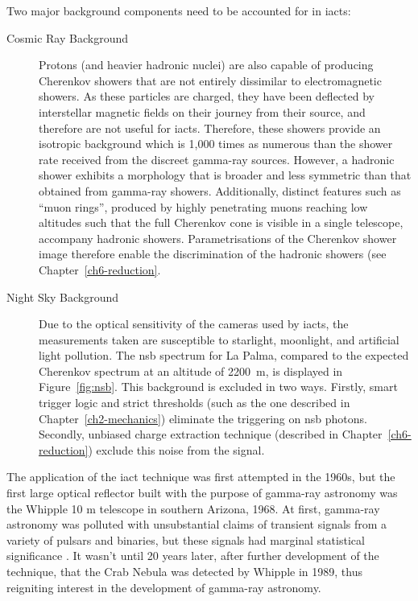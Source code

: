 Two major background components need to be accounted for in \glspl{iact}:
\begin{description}
\item [Cosmic Ray Background] Protons (and heavier hadronic nuclei) are also capable of producing Cherenkov showers that are not entirely dissimilar to electromagnetic showers. As these particles are charged, they have been deflected by interstellar magnetic fields on their journey from their source, and therefore are not useful for \glspl{iact}. Therefore, these showers provide an isotropic background which is 1,000 times as numerous than the shower rate received from the discreet gamma-ray sources. However, a hadronic shower exhibits a morphology that is broader and less symmetric than that obtained from gamma-ray showers. Additionally, distinct features such as ``muon rings'', produced by highly penetrating muons reaching low altitudes such that the full Cherenkov cone is visible in a single telescope, accompany hadronic showers. Parametrisations of the Cherenkov shower image therefore enable the discrimination of the hadronic showers (see Chapter~\ref{ch6-reduction}. 
\item [Night Sky Background] Due to the optical sensitivity of the cameras used by \glspl{iact}, the measurements taken are susceptible to starlight, moonlight, and artificial light pollution. The \gls{nsb} spectrum for La Palma, compared to the expected Cherenkov spectrum at an altitude of \SI{2200}{m}, is displayed in Figure~\ref{fig:nsb}. This background is excluded in two ways. Firstly, smart trigger logic and strict thresholds (such as the one described in Chapter~\ref{ch2-mechanics}) eliminate the triggering on \gls{nsb} photons. Secondly, unbiased charge extraction technique (described in Chapter~\ref{ch6-reduction}) exclude this noise from the signal.
\end{description}

The application of the \gls{iact} technique was first attempted in the 1960s, but the first large optical reflector built with the purpose of gamma-ray astronomy was the Whipple 10 m telescope in southern Arizona, 1968. At first, gamma-ray astronomy was polluted with unsubstantial claims of transient signals from a variety of pulsars and binaries, but these signals had marginal statistical significance \cite[][p.~9]{Weekes2003}. It wasn't until 20 years later, after further development of the technique, that the Crab Nebula was detected by Whipple in 1989, thus reigniting interest in the development of gamma-ray astronomy.

